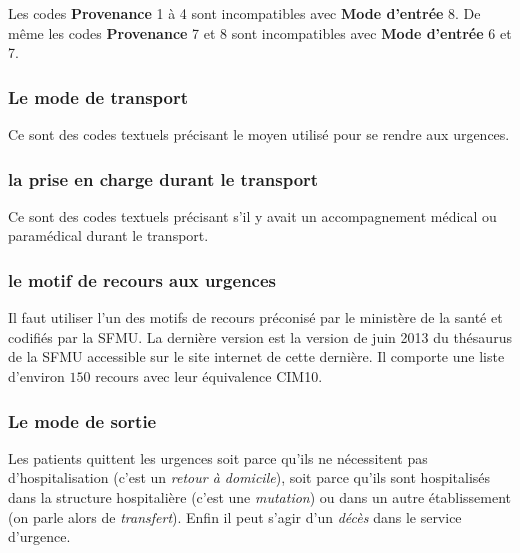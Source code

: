 \documentclass[12pt,english,french,twoside]{book}\usepackage[]{graphicx}\usepackage[]{color}
\begin{document}
Les codes \textbf{Provenance} 1 à 4 sont incompatibles avec \textbf{Mode d'entrée} 8. De même les codes \textbf{Provenance} 7 et 8 sont incompatibles avec \textbf{Mode d'entrée} 6 et 7.


\subsubsection{Le mode de transport}

Ce sont des codes textuels précisant le moyen utilisé pour se rendre aux urgences.

\subsubsection{la prise en charge durant le transport}

Ce sont des codes textuels précisant s'il y avait un accompagnement médical ou paramédical durant le transport.

\subsubsection{le motif de recours aux urgences}

Il faut utiliser l'un des motifs de recours préconisé par le ministère de la santé \cite{13} et codifiés par la SFMU. La dernière version est la version de juin 2013 du thésaurus de la SFMU accessible sur le site internet de cette dernière. Il comporte une liste d'environ $150$ recours avec leur équivalence CIM10.


\subsubsection{Le mode de sortie}

\label{ref:sortie}
Les patients quittent les urgences soit parce qu'ils ne nécessitent pas d'hospitalisation (c'est un \emph{retour à domicile}), soit parce qu'ils sont hospitalisés dans la structure hospitalière (c'est une \emph{mutation}) ou dans un autre établissement (on parle alors de \emph{transfert}). Enfin il peut s'agir d'un \emph{décès} dans le service d'urgence.
\end{document}
